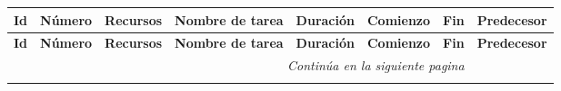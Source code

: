 \begin{center}
\begin{longtable}{  p{0.5cm}  p{1cm}  p{2cm}  p{4cm}  p{1.5cm}  p{2cm}  p{2cm}  p{2cm}  }

  \textbf{Id} & \textbf{Número}  & \textbf{Recursos} & \textbf{Nombre de tarea} & \textbf{Duración} & \textbf{Comienzo} & \textbf{Fin} & \textbf{Predecesor}  \\ \hline \hline
  \endfirsthead
  \textbf{Id} & \textbf{Número}  & \textbf{Recursos} & \textbf{Nombre de tarea} & \textbf{Duración} & \textbf{Comienzo} & \textbf{Fin} & \textbf{Predecesor}  \\ \hline \hline
  \endhead

  \multicolumn{7}{r}{\textit{Continúa en la siguiente pagina}} \\
  \endfoot
  \endlastfoot


\end{longtable}
\end{center}
